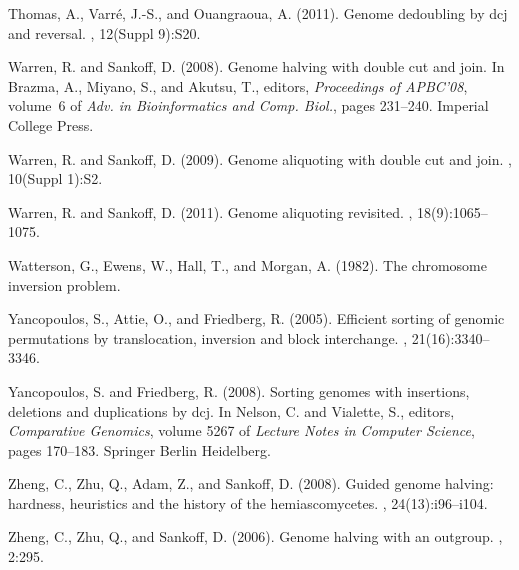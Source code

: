 \documentclass[11pt,final,twoside,nofrench]{thlifl}
\begin{document}
\begin{thebibliography}{}
Thomas, A., Varr{\'e}, J.-S., and Ouangraoua, A. (2011).
\newblock Genome dedoubling by dcj and reversal.
, 12(Suppl 9):S20.

Warren, R. and Sankoff, D. (2008).
\newblock Genome halving with double cut and join.
\newblock In Brazma, A., Miyano, S., and Akutsu, T., editors, {\em Proceedings
  of APBC'08}, volume~6 of {\em Adv. in Bioinformatics and Comp. Biol.}, pages
  231--240. Imperial College Press.

Warren, R. and Sankoff, D. (2009).
\newblock Genome aliquoting with double cut and join.
, 10(Suppl 1):S2.

Warren, R. and Sankoff, D. (2011).
\newblock Genome aliquoting revisited.
, 18(9):1065--1075.

Watterson, G., Ewens, W., Hall, T., and Morgan, A. (1982).
\newblock The chromosome inversion problem.

Yancopoulos, S., Attie, O., and Friedberg, R. (2005).
\newblock Efficient sorting of genomic permutations by translocation, inversion
  and block interchange.
, 21(16):3340--3346.

Yancopoulos, S. and Friedberg, R. (2008).
\newblock Sorting genomes with insertions, deletions and duplications by dcj.
\newblock In Nelson, C. and Vialette, S., editors, {\em Comparative Genomics},
  volume 5267 of {\em Lecture Notes in Computer Science}, pages 170--183.
  Springer Berlin Heidelberg.

Zheng, C., Zhu, Q., Adam, Z., and Sankoff, D. (2008).
\newblock Guided genome halving: hardness, heuristics and the history of the
  hemiascomycetes.
, 24(13):i96--i104.

Zheng, C., Zhu, Q., and Sankoff, D. (2006).
\newblock Genome halving with an outgroup.
, 2:295.

\end{thebibliography}

\bgroup
\small

\egroup
\end{document}

